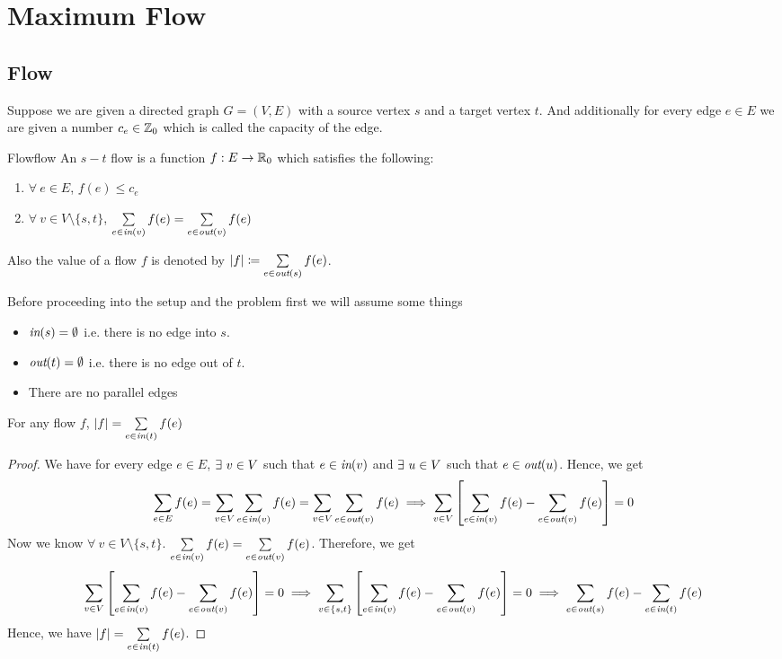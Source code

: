 \chapter{Maximum Flow}\label{max-flow}
\section{Flow}
Suppose we are given a directed graph $G=(V,E)$ with a source vertex $s$ and a target vertex $t$. And additionally for every edge $e\in E$ we are given a number $c_e\in \mathbb{Z}_0$ which is called the capacity of the edge.
\begin{Definition}{Flow}{flow}
	An $s-t$ flow is a function $f:E\to\mathbb{R}_0$ which satisfies the following:\begin{enumerate}[label=\protect\circled{\small\arabic*}]
		\item $\forall\ e\in E$, $f(e)\leq c_e$
		\item $\forall\ v\in V\setminus\{s,t\}$, $\sum\limits_{e\in \emph{in}(v)}f(e)=\sum\limits_{e\in \emph{out}(v)}f(e)$
	\end{enumerate}
	Also the value of a flow $f$ is denoted by $|f|\coloneqq \sum\limits_{e\in \emph{out}(s)}f(e)$.
\end{Definition}Before proceeding into the setup and the problem first we will assume some things
\begin{assumption*}
	\begin{itemize}
		\item $\emph{in}(s)=\emptyset$ i.e. there is no edge into $s$.
		\item $\emph{out}(t)=\emptyset$ i.e. there is no edge out of $t$.
		\item There are no parallel edges
	\end{itemize}
\end{assumption*}
\begin{lemma}{}{}
	For any flow $f$, $|f|=\sum\limits_{e\in \emph{in}(t)}f(e)$
\end{lemma}
\begin{proof}
	We have for every edge $e\in E$, $\exists\ v\in V$ such that $e\in \emph{in}(v)$ and $\exists\ u\in V$ such that $e\in \emph{out}(u)$. Hence, we get $$\sum_{e\in E}f(e)=\sum_{v\in V}\sum_{e\in\emph{in}(v)}f(e)=\sum_{v\in V}\sum_{e\in\emph{out}(v)}f(e)\implies \sum_{v\in V}\left[\sum_{e\in\emph{in}(v)}f(e)-\sum_{e\in\emph{out}(v)}f(e)\right]=0$$
	Now we know $\forall\ v\in V\setminus\{s,t\}$. $\sum\limits_{e\in\emph{in}(v)}f(e)=\sum\limits_{e\in\emph{out}(v)}f(e)$. Therefore, we get $$ \sum_{v\in V}\left[\sum_{e\in\emph{in}(v)}f(e)-\sum_{e\in\emph{out}(v)}f(e)\right]=0\implies \sum_{v\in \{s,t\}}\left[\sum_{e\in\emph{in}(v)}f(e)-\sum_{e\in\emph{out}(v)}f(e)\right]=0\implies \sum\limits_{e\in \emph{out}(s)}f(e)-\sum\limits_{e\in \emph{in}(t)}f(e)$$Hence, we have $|f|=\sum\limits_{e\in \emph{in}(t)}f(e)$.
\end{proof}

